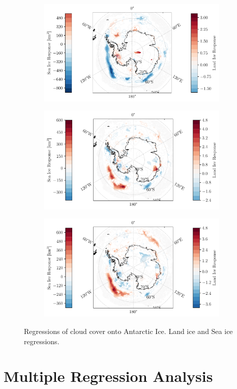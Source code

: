 \documentclass[../main.tex]{subfiles}
\begin{document}
\begin{figure}[hbt!]
    \centering
    \begin{subfigure}[b]{\textwidth}
    \includegraphics[width=\textwidth]{images/T2/single_regression/hres/cc_200_0.05}
    \end{subfigure}
    \begin{subfigure}[b]{\textwidth}
    \includegraphics[width=\textwidth]{images/T2/single_regression/hres/cc_500_0.05}
    \end{subfigure}
    \begin{subfigure}[b]{\textwidth}
    \includegraphics[width=\textwidth]{images/T2/single_regression/hres/cc_700_0.05}
    \end{subfigure}
    \caption{Regressions of cloud cover onto Antarctic Ice. Land ice and Sea ice regressions.}
    \label{fig:my_label}
\end{figure}

\section{Multiple Regression Analysis}
\end{document}
